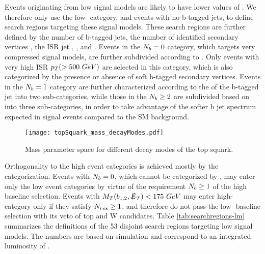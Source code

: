 Events originating from low \dm{} signal models are likely to have lower values of \mtb. We therefore only use the low-\mtb{} category, and events with no b-tagged jets, to define search regions targeting these signal models. These search regions are further defined by the number of b-tagged jets, the number of identified secondary vertices \nsv, the ISR jet \pt, \ptb, and \met. Events in the $N_{b}=0$ category, which targets very compressed signal models, are further subdivided according to \nj. Only events with very high ISR $p_{T}(>500~GeV)$ are selected in this category, which is also categorized by the presence or absence of soft b-tagged secondary vertices. Events in the $N_{b}=1$ category are further characterized according to the \pt{} of the b-tagged jet into two sub-categories, while those in the $N_{b}\geq2$ are subdivided based on \ptbonetwo{} into three sub-categories, in order to take advantage of the softer b jet \pt{} spectrum expected in signal events compared to the SM background. 

\begin{figure}
 	\centering
	\texttt{[image: topSquark\_mass\_decayModes.pdf]}
 	\caption[Top Squark Decay Modes]{Mass parameter space for different decay modes of the top squark.}
 	\label{StopParameterSpace} 
\end{figure}

Orthogonality to the high \dm{} event categories is achieved mostly by the \mtb{} categorization. Events with $N_{b}=0$, which cannot be categorized by \mtb, may enter only the low \dm{} event categories by virtue of the requirement $N_{b}\geq1$ of the high \dm{} baseline selection. Events with $M_{T}(b_{1,2},\slashed{E}_{T})<175~GeV$ may enter high-\dm{} category only if they satisfy $N_{res}\geq1$, and therefore do not pass the low-\dm{} baseline selection with its veto of top and W candidates. Table \ref{tab:searchregions-lm}  summarizes the definitions of the 53 disjoint search regions targeting low \dm{} signal models. The numbers are based on simulation and correspond to an integrated luminosity of \datalumi.


